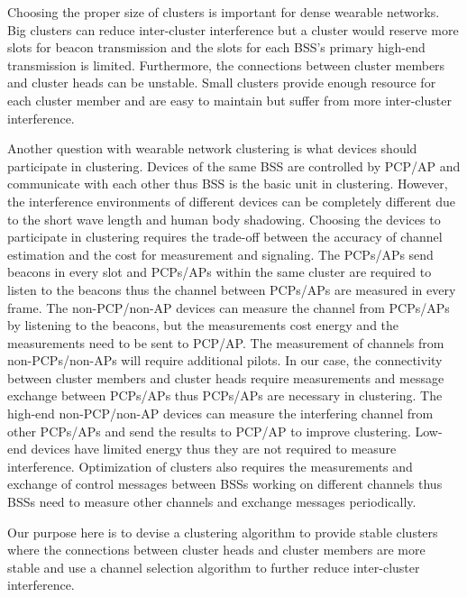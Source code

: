 \documentclass[10pt, conference, letterpaper]{IEEEtran}
\begin{document}
Choosing the proper size of clusters is important for dense wearable networks. Big clusters can reduce inter-cluster interference but a cluster would reserve more slots for beacon transmission and the slots for each BSS's primary high-end transmission is limited. Furthermore, the connections between cluster members and cluster heads can be unstable. 
Small clusters provide enough resource for each cluster member and are easy to maintain but suffer from more inter-cluster interference.

Another question with wearable network clustering is what devices should participate in clustering. Devices of the same BSS are controlled by PCP/AP and communicate with each other thus BSS is the basic unit in clustering. However, the interference environments of different devices can be completely different due to the short wave length and human body shadowing. Choosing the devices to participate in clustering requires the trade-off between the accuracy of channel estimation and the cost for measurement and signaling. 
The PCPs/APs send beacons in every slot and PCPs/APs within the same cluster are required to listen to the beacons thus the channel between PCPs/APs are measured in every frame. The non-PCP/non-AP devices can measure the channel from PCPs/APs by listening to the beacons, but the measurements cost energy and the measurements need to be sent to PCP/AP. The measurement of channels from non-PCPs/non-APs will require additional pilots. In our case, the connectivity between cluster members and cluster heads require measurements and message exchange between PCPs/APs thus PCPs/APs are necessary in clustering. The high-end non-PCP/non-AP devices can measure the interfering channel from other PCPs/APs and send the results to PCP/AP to improve clustering. Low-end devices have limited energy thus they are not required to measure interference. %
Optimization of clusters also requires the measurements and exchange of control messages between BSSs working on different channels thus BSSs need to measure other channels and exchange messages periodically. 

Our purpose here is to devise a clustering algorithm to provide stable clusters where the connections between cluster heads and cluster members are more stable and use a channel selection algorithm to further reduce inter-cluster interference.
\end{document}
